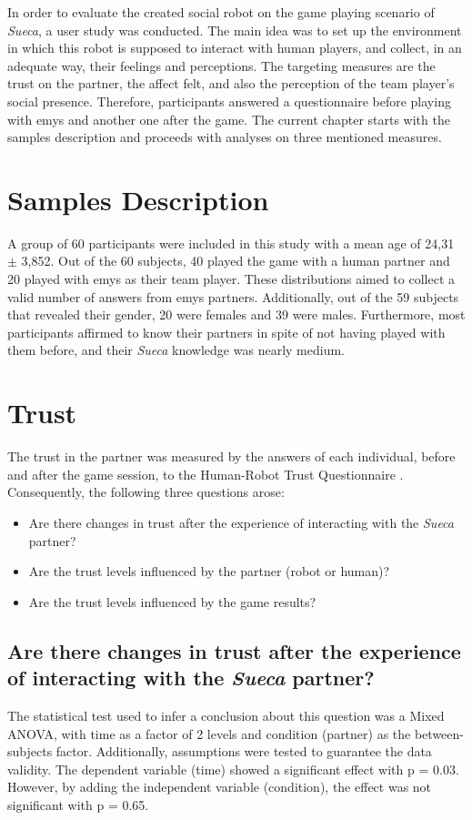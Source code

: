 \label{chapter:results}

In order to evaluate the created social robot on the game playing scenario of \emph{Sueca}, a user study was conducted.
The main idea was to set up the environment in which this robot is supposed to interact with human players, and collect, in an adequate way, their feelings and perceptions.
The targeting measures are the trust on the partner, the affect felt, and also the perception of the team player's social presence.
Therefore, participants answered a questionnaire before playing with \ac{emys} and another one after the game.
The current chapter starts with the samples description and proceeds with analyses on three mentioned measures.


\section{Samples Description}
\label{sec:samples}
A group of 60 participants were included in this study with a mean age of 24,31 $\pm$ 3,852.
Out of the 60 subjects, 40 played the game with a human partner and 20 played with \ac{emys} as their team player.
These distributions aimed to collect a valid number of answers from \ac{emys} partners.
Additionally, out of the 59 subjects that revealed their gender, 20 were females and 39 were males.
Furthermore, most participants affirmed to know their partners in spite of not having played with them before, and their \emph{Sueca} knowledge was nearly medium.

\section{Trust}
\label{sec:trust}
The trust in the partner was measured by the answers of each individual, before and after the game session, to the Human-Robot Trust Questionnaire \cite{Schaefer2013}.
Consequently, the following three questions arose:
\begin{itemize}
\item Are there changes in trust after the experience of interacting with the \emph{Sueca} partner?
\item Are the trust levels influenced by the partner (robot or human)?
\item Are the trust levels influenced by the game results?
\end{itemize}


\subsection*{Are there changes in trust after the experience of interacting with the \emph{Sueca} partner?}
The statistical test used to infer a conclusion about this question was a Mixed ANOVA, with time as a factor of 2 levels and condition (partner) as the between-subjects factor.
Additionally, assumptions were tested to guarantee the data validity.
The dependent variable (time) showed a significant effect with p = 0.03.
However, by adding the independent variable (condition), the effect was not significant with p = 0.65.

